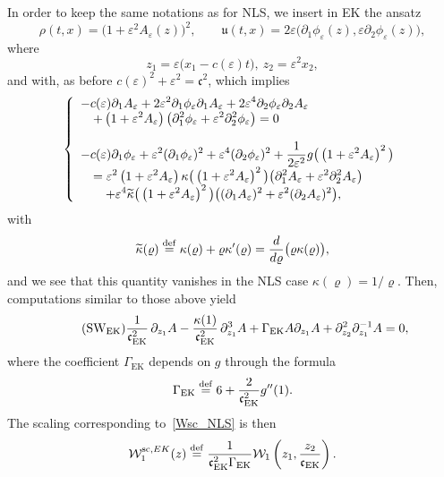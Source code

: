 \documentclass[10pt]{amsart}
\theoremstyle{definition}\newtheorem{defi}[theo]{Definition}\newtheorem{rema}[theo]{Remark}\newtheorem{exam}[theo]{Example}\newtheorem{exem}[theo]{Example}\newtheorem{nota}[theo]{Notation}
\newcommand*\p{\partial}
\newcommand*\ddef{\stackrel{\rm def}{=}}
\renewcommand{\sc}{\mathrm{sc}}
\newcommand{\EK}{\mathrm{EK}}
\newcommand*\BW{\mathcal{W}}
\newcommand*\ds{\displaystyle}
\newcommand*\cs{{\mathfrak c}}
\renewcommand*\u{\mathfrak{u}}
\newcommand*\e{\varepsilon}
\renewcommand*\t{\tilde}
\newcommand*\G{\Gamma}
\let\oldtilde\tilde
\renewcommand*{\tilde}[1]{\mathchoice{\widetilde{#1}}{\widetilde{#1}}{\oldtilde{#1}}{\oldtilde{#1}}}
\begin{document}
In order to keep the same notations as for NLS, we insert in EK the ansatz
\[
\rho (t, x) = \big(1 + \e^2 A_\e (z) \big)^2,
\quad \quad
\u (t, x) = 2 \e \big(\p_1 \phi_\e (z), \e \p_2 \phi_\e (z) \big),
\]
where
\[
z_1 = \e \big(x_1 - c(\e) t \big), \ z_2 = \e^2 x_2,
\]
and with, as before $ c(\e)^2 + \e^2 = \cs^2 $, which implies
\begin{equation}\label{MadTW_EK}
\left\{
\begin{array}{ll}
\ds{ - c(\e) \p_{1} A_\e + 2 \e^2 \p_{1} \phi_\e \p_{1} A_\e + 2 \e^4 \p_{2} \phi_\e \p_{2} A_\e }
\\ \quad
\ds{ + \left(1 + \e^2 A_\e\right) \big(\p_{1}^2 \phi_\e +
\e^2 \p^2_{2} \phi_\e \big)} = 0 \\ \ \\
\ds{ - c(\e) \p_{1} \phi_\e + \e^2 (\p_{1} \phi_\e)^2 + \e^4 (\p_{2} \phi_\e)^2 + \frac{1}{2 \e^2} g\big(\left(1 +\e^2 A_\e\right)^2 \big) }
\\ \quad
\ds{ =
\e^2 \left(1+\e^2 A_\e\right) \kappa \big(\left(1+\e^2 A_\e\right)^2 \big) \big(\p_{1}^2 A_\e + \e^2 \p_{2}^2 A_\e \big) }
\\ \quad \quad
\ds{ + \e^4 \t\kappa \big(\left(1+\e^2 A_\e\right)^2 \big) \big((\p_{1} A_\e)^2 + \e^2 (\p_{2} A_\e)^2 \big), }
\end{array}\right.
\end{equation} 
with
\[
\t\kappa (\varrho) \ddef
\kappa (\varrho) + \varrho \kappa' (\varrho) = \frac{d}{d \varrho} \big(\varrho \kappa (\varrho) \big),
\]
and we see that this quantity vanishes in the NLS case $ \kappa (\varrho) = 1/ \varrho $. Then, computations similar to those above yield
\begin{equation}
\tag{SW$_{\EK}$}
\frac{1}{\cs_{\EK}^2}\, \p_{z_1} A - \frac{\kappa(1)}{\cs_{\EK}^2} \, \p^3_{z_1} A + \G_{\EK} A \p_{z_1} A + \p_{z_2}^2 \p_{z_1}^{-1} A = 0,
\end{equation} where the coefficient $ \G_{\EK} $ depends on $ g$ through the formula
\[
\G_{\EK} \ddef 6 + \frac{2}{\cs_{\EK}^2} g''(1).
\]
The scaling corresponding to~\eqref{Wsc_NLS} is then
\begin{equation}\label{Wsc_EK}
\BW_1^{\sc, EK} (z) \ddef \frac{1}{\cs_{\EK}^2 \G_{\EK}} \BW_1 \left(z_1, \frac{z_2}{\cs_{\EK}} \right).
\end{equation}
\end{document}
